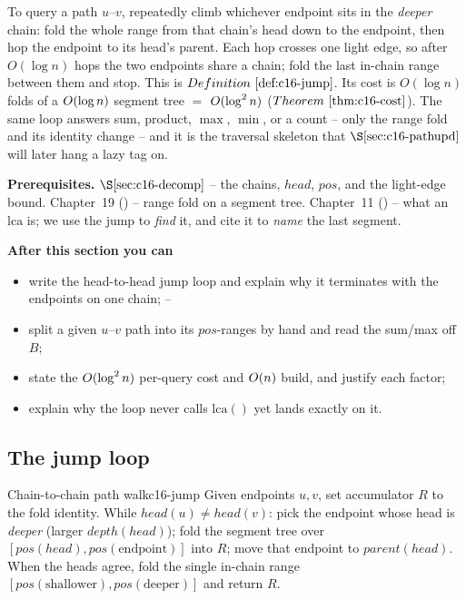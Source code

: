 \begin{topicintro}
To query a path \(u\)--\(v\), repeatedly climb whichever endpoint sits in the \emph{deeper} chain: fold the whole range from that chain's head down to the endpoint, then hop the endpoint to its head's parent.  Each hop crosses one light edge, so after \(O(\log n)\) hops the two endpoints share a chain; fold the last in-chain range between them and stop.  This is \(\defref{c16-jump}\).  Its cost is \(O(\log n)\) folds of a \(O(\log n)\) segment tree \(=\) \(O(\log^2 n)\) (\(\thmref{c16-cost}\)).  The same loop answers sum, product, \(\max\), \(\min\), or a count -- only the range fold and its identity change -- and it is the traversal skeleton that \(\secref{c16-pathupd}\) will later hang a lazy tag on.

\textbf{Prerequisites.} \(\secref{c16-decomp}\) -- the chains, \(\mathit{head}\), \(\mathit{pos}\), and the light-edge bound.  Chapter~19 () -- range fold on a segment tree.  Chapter~11 () -- what an \(\mathrm{lca}\) is; we use the jump to \emph{find} it, and cite it to \emph{name} the last segment.

\textbf{After this section you can}
\begin{itemize}[nosep]
  \item write the head-to-head jump loop and explain why it terminates with the endpoints on one chain; \hfill{}--
  \item split a given \(u\)--\(v\) path into its \(\mathit{pos}\)-ranges by hand and read the sum/max off \(B\); \hfill{}
  \item state the \(O(\log^2 n)\) per-query cost and \(O(n)\) build, and justify each factor; \hfill{}
  \item explain why the loop never calls \(\mathrm{lca}()\) yet lands exactly on it. \hfill{}
\end{itemize}
\end{topicintro}

\subsection{The jump loop}

\begin{definition}{Chain-to-chain path walk}{c16-jump}
Given endpoints \(u,v\), set accumulator \(R\) to the fold identity. While \(\mathit{head}(u)\ne\mathit{head}(v)\): pick the endpoint whose head is \emph{deeper} (larger \(\mathit{depth}(\mathit{head})\)); fold the segment tree over \([\mathit{pos}(\mathit{head}),\mathit{pos}(\text{endpoint})]\) into \(R\); move that endpoint to \(\mathit{parent}(\mathit{head})\). When the heads agree, fold the single in-chain range \([\mathit{pos}(\text{shallower}),\mathit{pos}(\text{deeper})]\) and return \(R\).
\end{definition}

